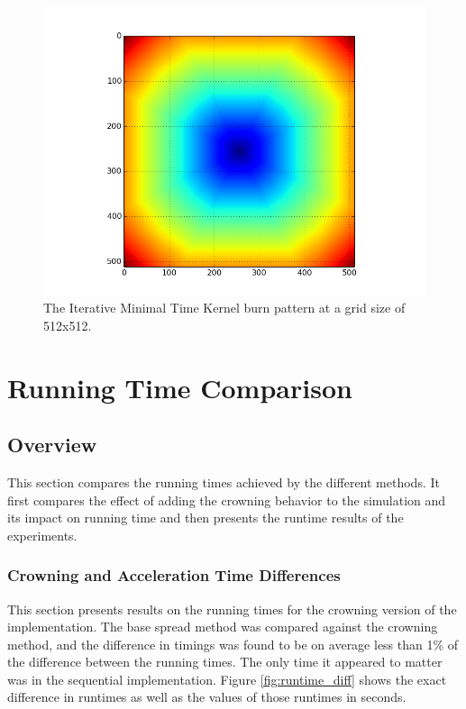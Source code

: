 \begin{figure}%
\centering
  \includegraphics[height=0.27\textheight]{figures/results/it_min_time.png}
  \caption{The Iterative Minimal Time Kernel burn pattern at a grid size of 512x512.}
  \label{fig:it_min_time}
\end{figure}

\section{Running Time Comparison}
\subsection{Overview}
This section compares the running times achieved by the different methods. It first compares the effect of adding the crowning behavior to the simulation and its impact on running time and then presents the runtime results of the experiments.

\subsubsection{Crowning and Acceleration Time Differences}
This section presents results on the running times for the crowning version of the implementation. The base spread method was compared against the crowning method, and the difference in timings was found to be on average less than 1\% of the difference between the running times. The only time it appeared to matter was in the sequential implementation. Figure \ref{fig:runtime_diff} shows the exact difference in runtimes as well as the values of those runtimes in seconds. 
 
